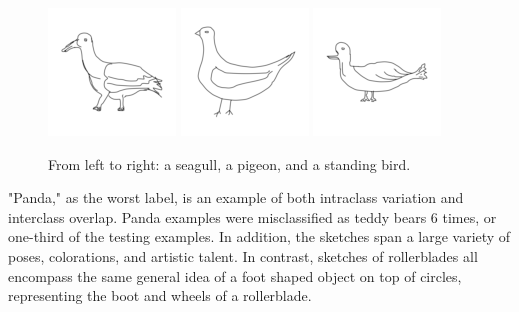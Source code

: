 \documentclass[10pt,twocolumn,letterpaper]{article}
\begin{document}
\begin{figure}[h]
	\begin{center}
	\includegraphics[width=0.3\linewidth]{seagull}
	\includegraphics[width=0.3\linewidth]{pigeon}
	\includegraphics[width=0.3\linewidth]{standingbird}
	\caption{From left to right: a seagull, a pigeon, and a standing bird.}
	\end{center}
\end{figure}

"Panda," as the worst label, is an example of both intraclass variation and interclass overlap. Panda examples were misclassified as teddy bears 6 times, or one-third of the testing examples. In addition, the sketches span a large variety of poses, colorations, and artistic talent. In contrast, sketches of rollerblades all encompass the same general idea of a foot shaped object on top of circles, representing the boot and wheels of a rollerblade.
\end{document}
